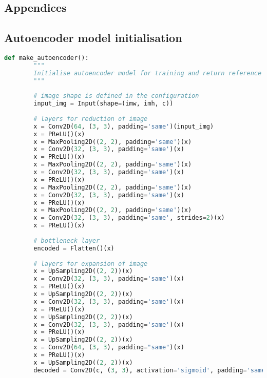 \documentclass{l4proj}
\begin{document}
\begin{appendices}

\chapter{Appendices}

\section{Autoencoder model initialisation}

\begin{lstlisting}[language=python, float, caption={Keras code for initialising the autoencoder model developed here. It contains 5 downsampling and upsampling operations. It returns both its encoder and decoder parts. The decoder is used to evaluate the performance of the autoencoder at image reconstruction. The encoder is used to encode images to project them onto a two-dimensional plane using t-SNE and UMAP, and is also the building block for our regression model. Started from a tutorial by \citet{chollet_keras}, and was expanded through experiments and research.}, label=lst:autoencoder]
    def make_autoencoder():
        """
        Initialise autoencoder model for training and return reference to both decoder and encoder parts of the model.
        """
    
        # image shape is defined in the configuration
        input_img = Input(shape=(imw, imh, c))
    
        # layers for reduction of image
        x = Conv2D(64, (3, 3), padding='same')(input_img)
        x = PReLU()(x)
        x = MaxPooling2D((2, 2), padding='same')(x)
        x = Conv2D(32, (3, 3), padding='same')(x)
        x = PReLU()(x)
        x = MaxPooling2D((2, 2), padding='same')(x)
        x = Conv2D(32, (3, 3), padding='same')(x)
        x = PReLU()(x)
        x = MaxPooling2D((2, 2), padding='same')(x)
        x = Conv2D(32, (3, 3), padding='same')(x)
        x = PReLU()(x)
        x = MaxPooling2D((2, 2), padding='same')(x)
        x = Conv2D(32, (3, 3), padding='same', strides=2)(x)
        x = PReLU()(x)
        
        # bottleneck layer
        encoded = Flatten()(x)
    
        # layers for expansion of image 
        x = UpSampling2D((2, 2))(x)
        x = Conv2D(32, (3, 3), padding='same')(x)
        x = PReLU()(x)
        x = UpSampling2D((2, 2))(x)
        x = Conv2D(32, (3, 3), padding='same')(x)
        x = PReLU()(x)
        x = UpSampling2D((2, 2))(x)
        x = Conv2D(32, (3, 3), padding='same')(x)
        x = PReLU()(x)
        x = UpSampling2D((2, 2))(x)
        x = Conv2D(64, (3, 3), padding="same")(x)
        x = PReLU()(x)
        x = UpSampling2D((2, 2))(x)
        decoded = Conv2D(c, (3, 3), activation='sigmoid', padding='same')(x)
    

\end{lstlisting}
\end{appendices}
\end{document}
